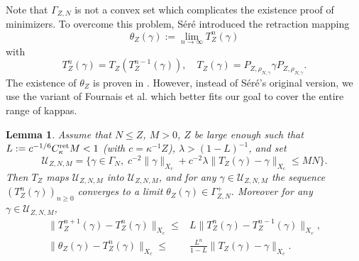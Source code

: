 \documentclass[a4paper]{amsart}
\newtheorem{lemma}{Lemma}
\def\cU{{\mathcal U}}
\begin{document}
Note that $\Gamma_{Z,N}$ is not a convex set which complicates the
existence proof of minimizers. To overcome this problem, S\'er\'e  introduced the retraction mapping
\begin{equation}
    \theta_Z(\gamma):=\lim_{n\rightarrow \infty} T_Z^n(\gamma)
\end{equation}
with
\begin{equation}
  T_Z^n(\gamma)=T_Z(T_Z^{n-1}(\gamma)),\quad T_Z(\gamma)=P_{Z, \rho_{N,\gamma}}\gamma P_{Z, \rho_{N,\gamma}}.
\end{equation}
The existence of $\theta_Z$ is proven in \cite[Proposition
2.9]{Sere2023}. However, instead of S\'er\'e's original version, we
use the variant of Fournais et al.  \cite{Fournaisetal2020} which better
fits our goal to cover the entire range of kappas.
\begin{lemma}\label{lem:retra}
  Assume that $N\leq Z$, $M>0$, $Z$ be large enough such that
  $L:=c^{-1/6}C_{\kappa}^{\rm ret}M<1$ (with $c=\kappa^{-1}Z$),
  $\lambda>(1-L)^{-1}$, and set
\begin{equation}
    \cU_{Z,N,M}=\{\gamma\in \Gamma_{N},\; 
   c^{-2} \|\gamma\|_{X_c}+c^{-2} \lambda\|T_Z(\gamma)-\gamma\|_{X_c}\leq MN\}.
\end{equation}
Then $T_Z$ maps $ \cU_{Z,N,M}$ into $ \cU_{Z,N,M}$, and for any $\gamma\in \cU_{Z,N,M}$ the sequence $(T_Z^n(\gamma))_{n\geq 0}$ converges to a limit $\theta_Z(\gamma)\in\Gamma_{Z,N}^+$. Moreover for any $\gamma\in \cU_{Z,N,M}$,
\begin{equation}\label{eq:retra}
    \begin{split}
    \|T_Z^{n+1}(\gamma)-T_Z^{n}(\gamma)\|_{X_c}\leq &L \|T_Z^n(\gamma)-T_Z^{n-1}(\gamma)\|_{X_c},\\
    \|\theta_Z(\gamma)-T_Z^n(\gamma)\|_{X_c}\leq&\frac{L^n}{1-L}\|T_Z(\gamma)-\gamma\|_{X_c}.
\end{split}
\end{equation}
\end{lemma}
\end{document}
